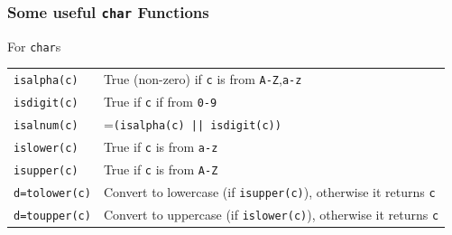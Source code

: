 \documentclass[smaller,handout,table]{beamer}
\begin{document}
\begin{frame}
\frametitle{Some useful {\tt char} Functions}
\begin{block}{For {\tt char}s}
\begin{tabular}{l p{200pt}}
\tt isalpha(c)&True (non-zero) if {\tt c} is from {\tt A-Z},{\tt a-z}\\
\tt isdigit(c)&True if {\tt c} if from {\tt 0-9}\\
\tt isalnum(c)&={\tt (isalpha(c) || isdigit(c))}\\
\tt islower(c)&True if {\tt c} is from {\tt a-z}\\
\tt isupper(c)&True if {\tt c} is from {\tt A-Z}\\
\tt d=tolower(c)&Convert to lowercase (if {\tt isupper(c)}), otherwise it returns {\tt c}\\
\tt d=toupper(c)&Convert to uppercase (if {\tt islower(c)}), otherwise it returns {\tt c}
\end{tabular}
\end{block}
\end{frame}
\end{document}
